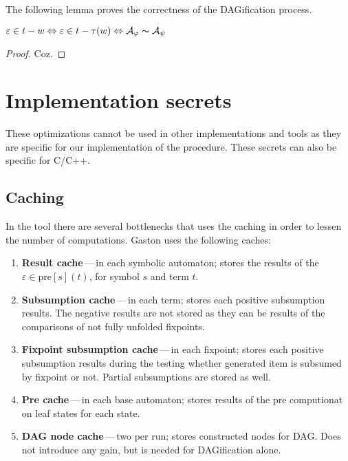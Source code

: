   The following lemma proves the correctness 
  of the DAGification process.\begin{lemma}
  $\varepsilon \in t - w \Leftrightarrow \varepsilon \in t - \tau(w) 
  \Leftrightarrow \mathcal{A}_{\varphi} \thicksim \mathcal{A}_{\psi}$
  \end{lemma}
  \begin{proof}
  Coz.
  \end{proof}

\section{Implementation secrets}
These optimizations cannot be used in other implementations and tools
as they are specific for our implementation of the procedure. These
secrets can also be specific for C/C++.

  \subsection{Caching}\label{opt:cache}
  
  In the tool there are several bottlenecks that uses the caching
  in order to lessen the number of computations. Gaston uses the
  following caches:
  \begin{enumerate}
  	\item \textbf{Result cache}\,---\,in each symbolic automaton;
  	stores the results of the $\varepsilon \in \text{pre}[s](t)$,
  	for symbol $s$ and term $t$. 
  	\item \textbf{Subsumption cache}\,---\,in each term; stores each
  	positive subsumption results. The negative results are not 
  	stored as they can be results of the comparisons of not fully
  	unfolded fixpoints. 
  	\item \textbf{Fixpoint subsumption cache}\,---\,in each fixpoint;
  	stores each positive subsumption results during the testing 
  	whether generated item is subsumed by fixpoint or not. Partial
  	subsumptions are stored as well.
  	\item \textbf{Pre cache}\,---\,in each base automaton; stores
  	results of the pre computionat on leaf states for each state.
  	\item \textbf{DAG node cache}\,---\,two per run; stores 
  	constructed nodes for DAG. Does not introduce any gain, but is
  	needed for DAGification alone.
  \end{enumerate}
  
